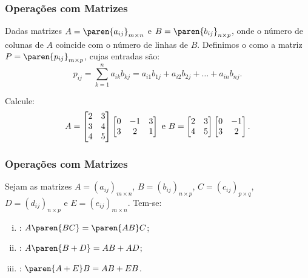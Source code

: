 
\begin{frame}
    \frametitle{Operações com Matrizes}
    
    \begin{definicao}
        Dadas matrizes $ A = \paren{a_{ij}}_{m \times n}$ e $ B = \paren{b_{ij}}_{n \times p}$, onde o número de colunas de $A$ coincide com o número de linhas de $B$. Definimos o  como a matriz $P = \paren{p_{ij}}_{m \times p}$, cujas entradas são:
        $$ p_{ij} = \sum_{k=1}^n a_{ik}b_{kj} = a_{i1}b_{1j}+ a_{i2}b_{2j}+ \dots + a_{in}b_{nj}.$$
    \end{definicao} \pause

    \begin{exemplo}\label{exprodmatriz}
        Calcule: 
        \begin{displaymath} A =
            \begin{bmatrix}
                2 & 3 \\
                3 & 4 \\
                4 & 5
            \end{bmatrix}  
            \begin{bmatrix}
                0 & -1 & 3 \\
                3 & 2 & 1 
            \end{bmatrix} \space \text{ e } \space B =
            \begin{bmatrix}
                2 & 3 \\
                4 & 5
            \end{bmatrix}  
            \begin{bmatrix}
                0 & -1 \\
                3 & 2 
            \end{bmatrix} .
        \end{displaymath}
    \end{exemplo}
\end{frame}


\begin{frame}
	\frametitle{Operações com Matrizes} 
	
	\begin{proposicao}
		\label{propopmatriz2}
		Sejam as matrizes $A=(a_{ij})_{m \times n}$, $B=(b_{ij})_{n \times p}$, $C=(c_{ij})_{p \times q}$, $D=(d_{ij})_{n \times p}$ e $E=(e_{ij})_{m \times n}$. Tem-se:
		\begin{enumerate}[i.]
			\item {}: $A  \paren{B  C}= \paren{A  B} C$;
			\item {}: $A\paren{B + D} = AB + AD$;
			\item {}: $\paren{A + E}B = AB + EB$.
		\end{enumerate}
	\end{proposicao} 
\end{frame}

